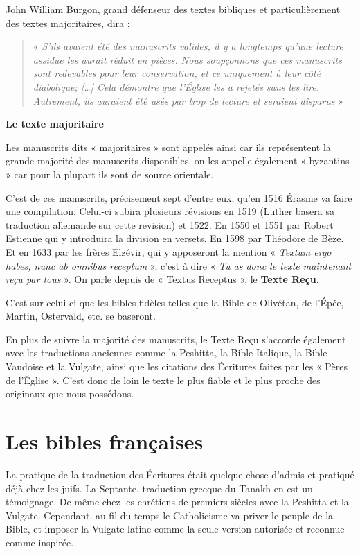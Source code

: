 \begin{small}
John William Burgon, grand défenseur des textes bibliques et particulièrement des textes majoritaires, dira :
\begin{quote}
« \emph{S’ils avaient été des manuscrits valides, il y a longtemps qu’une lecture assidue les aurait réduit en pièces. Nous soupçonnons que ces manuscrits sont redevables pour leur conservation, et ce uniquement à leur côté diabolique; […] Cela démontre que l’Église les a rejetés sans les lire. Autrement, ils auraient été usés par trop de lecture et seraient disparus} »\newline
\end{quote}

\textbf{Le texte majoritaire}\bigskip

Les manuscrits dits « majoritaires » sont appelés ainsi car ils représentent la grande majorité des manuscrits disponibles, on les appelle également « byzantins » car pour la plupart ils sont de source orientale.\bigskip

C'est de ces manuscrits, précisement sept d'entre eux, qu'en 1516 Érasme va faire une compilation. Celui-ci subira plusieurs révisions en 1519 (Luther basera sa traduction allemande sur cette revision) et 1522. En 1550 et 1551 par Robert Estienne qui y introduira la division en versets. En 1598 par Théodore de Bèze. Et en 1633 par les frères Elzévir, qui y apposeront la mention « \emph{Textum ergo habes, nunc ab omnibus receptum} », c'est à dire « \emph{Tu as donc le texte maintenant reçu par tous} ». On parle depuis de « Textus Receptus », le \textbf{Texte Reçu}.\bigskip

C'est sur celui-ci que les bibles fidèles telles que la Bible de Olivétan, de l'Épée, Martin, Ostervald, etc. se baseront.\bigskip

En plus de suivre la majorité des manuscrits, le Texte Reçu s'accorde également avec les traductions anciennes comme la Peshitta, la Bible Italique, la Bible Vaudoise et la Vulgate, ainsi que les citations des Écritures faites par les « Pères de l'Église ». C'est donc de loin le texte le plus fiable et le plus proche des originaux que nous possédons.

\section*{Les bibles françaises}

La pratique de la traduction des Écritures était quelque chose d'admis et pratiqué déjà chez les juifs. La Septante, traduction grecque du Tanakh en est un témoignage. De même chez les chrétiens de premiers siècles avec la Peshitta et la Vulgate. Cependant, au fil du temps le Catholicisme va priver le peuple de la Bible, et imposer la Vulgate latine comme la seule version autorisée et reconnue comme inspirée.\bigskip


\end{small}
